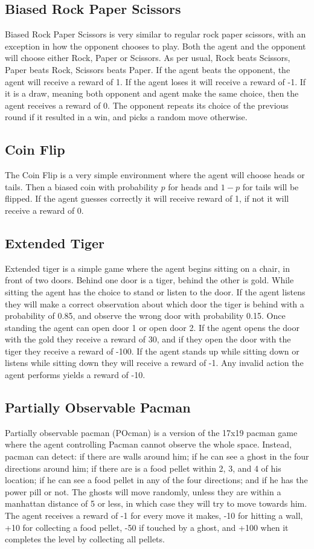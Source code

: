 \documentclass{article}
\theoremstyle{definition}
\newtheorem{primary statistics}[definition]{Primary Statistics}
\newtheorem{auxiliary statistics}[definition]{Auxiliary Statistics}
\begin{document}
\subsection{Biased Rock Paper Scissors}
Biased Rock Paper Scissors is very similar to regular rock paper scissors, with an exception in how the opponent chooses to play. Both the agent and the opponent will choose either Rock, Paper or Scissors. As per usual, Rock beats Scissors, Paper beats Rock, Scissors beats Paper. If the agent beats the opponent, the agent will receive a reward of 1. If the agent loses it will receive a reward of -1. If it is a draw, meaning both opponent and agent make the same choice, then the agent receives a reward of 0. The opponent repeats its choice of the previous round if it resulted in a win, and picks a random move otherwise. 

\subsection{Coin Flip}
The Coin Flip is a very simple environment where the agent will choose heads or tails. Then a biased coin with probability $p$ for heads and $1-p$ for tails will be flipped. If the agent guesses correctly it will receive reward of 1, if not it will receive a reward of 0.

\subsection{Extended Tiger}
Extended tiger is a simple game where the agent begins sitting on a chair, in front of two doors. Behind one door is a tiger, behind the other is gold. While sitting the agent has the choice to stand or listen to the door. If the agent listens they will make a correct observation about which door the tiger is behind with a probability of 0.85, and observe the wrong door with probability 0.15. Once standing the agent can open door 1 or open door 2. If the agent opens the door with the gold they receive a reward of 30, and if they open the door with the tiger they receive a reward of -100. If the agent stands up while sitting down or listens while sitting down they will receive a reward of -1. Any invalid action the agent performs yields a reward of -10.

\subsection{Partially Observable Pacman}
Partially observable pacman (POcman) is a version of the 17x19 pacman game where the agent controlling Pacman cannot observe the whole space. Instead, pacman can detect: if there are walls around him; if he can see a ghost in the four directions around him; if there are is a food pellet within 2, 3, and 4 of his location; if he can see a food pellet in any of the four directions; and if he has the power pill or not. The ghosts will move randomly, unless they are within a manhattan distance of 5 or less, in which case they will try to move towards him. The agent receives a reward of -1 for every move it makes, -10 for hitting a wall, +10 for collecting a food pellet, -50 if touched by a ghost, and +100 when it completes the level by collecting all pellets.
\end{document}
